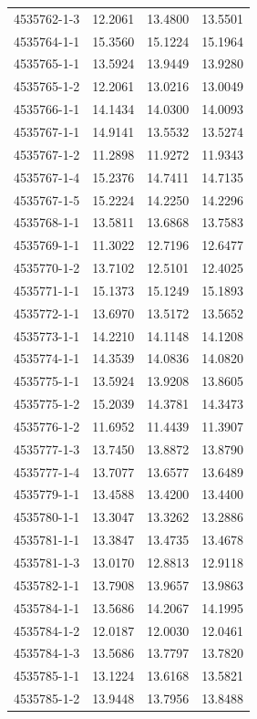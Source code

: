 \begin{longtable}{lrrr}
4535762-1-3 & 12.2061 & 13.4800 & 13.5501 \\
4535764-1-1 & 15.3560 & 15.1224 & 15.1964 \\
4535765-1-1 & 13.5924 & 13.9449 & 13.9280 \\
4535765-1-2 & 12.2061 & 13.0216 & 13.0049 \\
4535766-1-1 & 14.1434 & 14.0300 & 14.0093 \\
4535767-1-1 & 14.9141 & 13.5532 & 13.5274 \\
4535767-1-2 & 11.2898 & 11.9272 & 11.9343 \\
4535767-1-4 & 15.2376 & 14.7411 & 14.7135 \\
4535767-1-5 & 15.2224 & 14.2250 & 14.2296 \\
4535768-1-1 & 13.5811 & 13.6868 & 13.7583 \\
4535769-1-1 & 11.3022 & 12.7196 & 12.6477 \\
4535770-1-2 & 13.7102 & 12.5101 & 12.4025 \\
4535771-1-1 & 15.1373 & 15.1249 & 15.1893 \\
4535772-1-1 & 13.6970 & 13.5172 & 13.5652 \\
4535773-1-1 & 14.2210 & 14.1148 & 14.1208 \\
4535774-1-1 & 14.3539 & 14.0836 & 14.0820 \\
4535775-1-1 & 13.5924 & 13.9208 & 13.8605 \\
4535775-1-2 & 15.2039 & 14.3781 & 14.3473 \\
4535776-1-2 & 11.6952 & 11.4439 & 11.3907 \\
4535777-1-3 & 13.7450 & 13.8872 & 13.8790 \\
4535777-1-4 & 13.7077 & 13.6577 & 13.6489 \\
4535779-1-1 & 13.4588 & 13.4200 & 13.4400 \\
4535780-1-1 & 13.3047 & 13.3262 & 13.2886 \\
4535781-1-1 & 13.3847 & 13.4735 & 13.4678 \\
4535781-1-3 & 13.0170 & 12.8813 & 12.9118 \\
4535782-1-1 & 13.7908 & 13.9657 & 13.9863 \\
4535784-1-1 & 13.5686 & 14.2067 & 14.1995 \\
4535784-1-2 & 12.0187 & 12.0030 & 12.0461 \\
4535784-1-3 & 13.5686 & 13.7797 & 13.7820 \\
4535785-1-1 & 13.1224 & 13.6168 & 13.5821 \\
4535785-1-2 & 13.9448 & 13.7956 & 13.8488 \\

\end{longtable}
